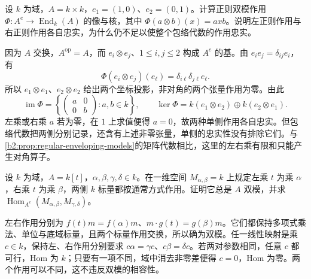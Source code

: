 \begin{exercise}\label{b2:ex:11-matrix-enveloping}
	设 \(k\) 为域，\(A=k\times k\)，\(e_1=(1,0)\)、\(e_2=(0,1)\)。计算正则双模作用 \(\Phi:A^e\to\operatorname{End}_k(A)\) 的像与核，其中 \(\Phi(a\otimes b)(x)=axb\)。说明左正则作用与右正则作用各自忠实，为什么仍不足以使整个包络代数的作用忠实。
\end{exercise}
\begin{solution}
	因为 \(A\) 交换，\(A^{\mathrm{op}}=A\)，而 \(e_i\otimes e_j\)、\(1\le i,j\le2\) 构成 \(A^e\) 的基。由 \(e_ie_j=\delta_{ij}e_i\)，有
	\[
		\Phi(e_i\otimes e_j)(e_\ell) =\delta_{i\ell}\delta_{j\ell}e_\ell.
	\]
	所以 \(e_1\otimes e_1\)、\(e_2\otimes e_2\) 给出两个坐标投影，非对角的两个张量作用为零。由此
	\[
		\operatorname{im}\Phi
		=\left\{\begin{pmatrix}a&0\\0&b\end{pmatrix}:a,b\in k\right\},
		\qquad \ker\Phi=k(e_1\otimes e_2)\oplus k(e_2\otimes e_1).
	\]
	左乘或右乘 \(a\) 若为零，在 \(1\) 上求值便得 \(a=0\)，故两种单侧作用各自忠实。但包络代数把两侧分别记录，还含有上述非零张量，单侧的忠实性没有排除它们。与\cref{b2:prop:regular-enveloping-models}的矩阵代数相比，这里的左右乘有限和只能产生对角算子。
\end{solution}

\begin{exercise}\label{b2:ex:11-one-dimensional-bimodules}
	设 \(k\) 为域，\(A=k[t]\)，\(\alpha,\beta,\gamma,\delta\in k\)。在一维空间 \(M_{\alpha,\beta}=k\) 上规定左乘 \(t\) 为乘 \(\alpha\)，右乘 \(t\) 为乘 \(\beta\)，两侧 \(k\) 标量都按通常方式作用。证明它总是 \(A\) 双模，并求 \(\operatorname{Hom}_{A^e}(M_{\alpha,\beta},M_{\gamma,\delta})\)。
\end{exercise}
\begin{solution}
	左右作用分别为 \(f(t)m=f(\alpha)m\)、\(m\cdot g(t)=g(\beta)m\)。它们都保持多项式乘法、单位与底域标量，且两个标量作用交换，所以确为双模。任一线性映射是乘 \(c\in k\)，保持左、右作用分别要求 \(c\alpha=\gamma c\)、\(c\beta=\delta c\)。若两对参数相同，任意 \(c\) 都可行，Hom 为 \(k\)；只要有一项不同，域中消去非零差便得 \(c=0\)，Hom 为零。两个作用可以不同，这不违反双模的相容性。
\end{solution}

